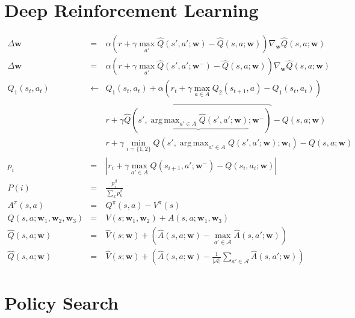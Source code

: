 \documentclass[]{article}
\DeclareMathOperator*{\argmax}{arg\,max}
\newcommand{\vect}[1]{\mathbf{#1}}
\begin{document}
\section{Deep Reinforcement Learning}

\begin{eqnarray}
    \Delta \vect{w} &=& \alpha (r + \gamma \max_{a'} \hat{Q}(s',a';\vect{w}) - \hat{Q}(s,a;\vect{w})) \nabla_{\vect{w}}\hat{Q}(s,a;\vect{w})\\
    \Delta \vect{w} &=& \alpha (r + \gamma \max_{a'} \hat{Q}(s',a';\vect{w}^-) - \hat{Q}(s,a;\vect{w})) \nabla_{\vect{w}}\hat{Q}(s,a;\vect{w})\\
    Q_1(s_t, a_t) &\gets& Q_1(s_t, a_t) + \alpha (r_t +\gamma \max_{a\in A} Q_2(s_{t+1}, a) - Q_1(s_t, a_t))\\
    &&r + \gamma \overbrace{\hat{Q}(s', \underbrace{\argmax_{a' \in A} \hat{Q}(s',a';\vect{w})}_{};\vect{w}^-)}^{} - Q(s,a;\vect{w})\\
    &&r + \gamma \min_{i=\{1,2\}}Q(s', \argmax_{a' \in A} Q(s', a'; \vect{w}); \vect{w}_i) - Q(s,a;\vect{w})\\
    p_i &=& | r_i + \gamma \max_{a' \in A} Q(s_{i+1}, a'; \vect{w}^-) - Q(s_i,a_i;\vect{w}) |\\
    P(i) &=& \frac{p_i^\beta}{\sum_k p_k^\beta}\\
    A^\pi (s,a) &=& Q^\pi(s,a) - V^\pi(s) \\
    Q(s,a;\vect{w}_1, \vect{w}_2, \vect{w}_3) &=& V(s;\vect{w}_1, \vect{w}_2) + A(s,a;\vect{w}_1, \vect{w}_3)\\
    \hat{Q}(s,a;\vect{w}) &=& \hat{V}(s;\vect{w}) + \left( \hat{A}(s,a;\vect{w}) - \max_{a' \in \mathcal{A}} \hat{A}(s,a';\vect{w}) \right) \\
    \hat{Q}(s,a;\vect{w}) &=& \hat{V}(s;\vect{w}) + \left( \hat{A}(s,a;\vect{w}) - \frac{1}{|\mathcal{A}|} \sum_{a' \in \mathcal{A}} \hat{A}(s,a';\vect{w}) \right)
\end{eqnarray}

\section{Policy Search}
\end{document}

